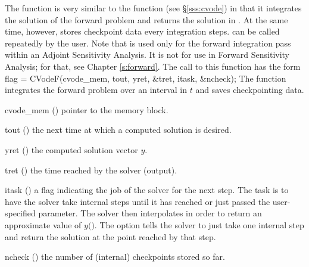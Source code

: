 The function  is very similar to the {\cvodes} function 
(see \S\ref{sss:cvode}) in that it integrates the solution of the forward
problem and returns the solution in . At the same time, however,
 stores checkpoint data every  integration steps. 
can be called repeatedly by the user.
Note that  is used only for the forward integration pass within
an Adjoint Sensitivity Analysis.  It is not for use in Forward Sensitivity
Analysis; for that, see Chapter \ref{s:forward}.
The call to this function has the form
{
  flag = CVodeF(cvode\_mem, tout, yret, \&tret, itask, \&ncheck);
}
{
  The function  integrates the forward problem over an interval in $t$
  and saves checkpointing data.
}
{
  \begin{args}
  \item[cvode\_mem] ()
    pointer to the {\cvodes} memory block.
  \item[tout] ()
    the next time at which a computed solution is desired.
  \item[yret] ()
    the computed solution vector $y$.
  \item[tret] ()
    the time reached by the solver (output).
  \item[itask] ()
    a flag indicating the job of the solver for the next step.
    The  task is to have the solver take internal steps until
    it has reached or just passed the user-specified 
    parameter. The solver then interpolates in order to
    return an approximate value of $y($$)$.
    The  option tells the solver to just take one internal step
    and return the solution at the point reached by that step.
  \item[ncheck] ()
    the number of (internal) checkpoints stored so far.
  \end{args}
}
